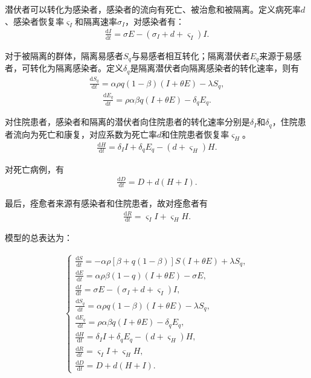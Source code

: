 \documentclass{whutmod}
\begin{document}
			潜伏者可以转化为感染者，感染者的流向有死亡、被治愈和被隔离。定义病死率$d$、感染者恢复率$\varsigma_I$和隔离速率$\sigma_I$，对感染者有：
			\begin{gather}
			\frac{\mathrm{d} I}{\mathrm{d} t}=\sigma E-(\sigma_I+d+\varsigma_I)I.
			\end{gather}
			
			对于被隔离的群体，隔离易感者$S_q$与易感者相互转化；隔离潜伏者$E_q$来源于易感者，可转化为隔离感染者。定义$\delta_q$是隔离潜伏者向隔离感染者的转化速率，则有
			\begin{gather}
			\frac{\mathrm{d} S_q}{\mathrm{d} t}=\alpha\rho q(1-\beta)(I+\theta E)-\lambda S_q,
			\end{gather}
			\begin{gather}
			\frac{\mathrm{d} E_q}{\mathrm{d} t}=\rho \alpha \beta q(I+\theta E)-\delta_q E_q.
			\end{gather}
			
			对住院患者，感染者和隔离的潜伏者向住院患者的转化速率分别是$\delta_I$和$\delta_q$，住院患者流向为死亡和康复，对应系数为死亡率$d$和住院患者恢复率$\varsigma_H$。
			\begin{gather}
			\frac{\mathrm{d}H }{\mathrm{d} t}=\delta_I I+ \delta_q E_q-(d+\varsigma_H )H.
			\end{gather}
			
			对死亡病例，有
			\begin{gather}
			\frac{\mathrm{d} D}{\mathrm{d} t}= D + d(H+I).
			\end{gather}
			
			最后，痊愈者来源有感染者和住院患者，故对痊愈者有
			\begin{gather}
			\frac{\mathrm{d} R}{\mathrm{d} t}=\varsigma_I I+\varsigma_H H.
			\end{gather}
			
			模型的总表达为：
			\begin{spacing}{2}
			\begin{gather}
			\left\{\begin{array}{l}
			\frac{\mathrm{d} S}{\mathrm{d} t}=-\alpha\rho [\beta +q(1-\beta)]S(I+\theta E)+\lambda S_{q},
			\\ \frac{\mathrm{d} E}{\mathrm{d} t}=\alpha\rho\beta(1-q) (I+\theta E)-\sigma E,
			\\ \frac{\mathrm{d} I}{\mathrm{d} t}=\sigma E-(\sigma_I+d+\varsigma_I)I,
			\\ \frac{\mathrm{d} S_q}{\mathrm{d} t}=\alpha\rho q(1-\beta)(I+\theta E)-\lambda S_q,
			\\ \frac{\mathrm{d} E_q}{\mathrm{d} t}=\rho \alpha \beta q(I+\theta E)-\delta_q E_q,
			\\ \frac{\mathrm{d}H }{\mathrm{d} t}=\delta_I I+ \delta_q E_q-(d+\varsigma_H )H,
			\\ \frac{\mathrm{d} R}{\mathrm{d} t}=\varsigma_I I+\varsigma_H H,
			\\\frac{\mathrm{d} D}{\mathrm{d} t}= D + d(H+I).
			\end{array}\right.
			\end{gather}
			\end{spacing}
\end{document}
